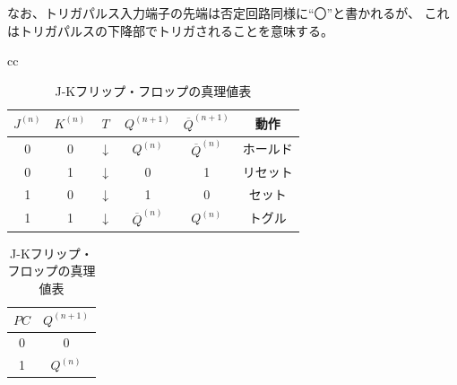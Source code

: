 \documentclass[12pt]{jarticle}
\begin{document}
\begin{itemize}
          なお、トリガパルス入力端子の先端は否定回路同様に``〇''と書かれるが、
          これはトリガパルスの下降部でトリガされることを意味する。
          \begin{table}[h]
              \caption{J-Kフリップ・フロップの真理値表}
              \begin{center}
                  \begin{tabular}{cc}
                      \begin{minipage}{0.6\hsize}
                          \begin{center}
                              \begin{tabular}{|c|c|c|c|c|c|}
                                  \hline
                                  $J^{(n)}$ & $K^{(n)}$ & $T$          & $Q^{(n+1)}$            & ${\overline{Q}}^{(n + 1)}$ & 動作     \\
                                  \hline
                                  0         & 0         & $\downarrow$ & $Q^{(n)}$              & $ {\overline{Q}}^{(n)}$    & ホールド \\
                                  \hline
                                  0         & 1         & $\downarrow$ & 0                      & 1                          & リセット \\
                                  \hline
                                  1         & 0         & $\downarrow$ & 1                      & 0                          & セット   \\
                                  \hline
                                  1         & 1         & $\downarrow$ & ${\overline{Q}}^{(n)}$ & $Q^{(n)}$                  & トグル   \\
                                  \hline
                              \end{tabular}
                          \end{center}
                      \end{minipage}
                      \begin{minipage}{0.4\hsize}
                          \begin{center}
                              \begin{tabular}{|c|c|}
                                  \hline
                                  $PC$ & $Q^{(n + 1)}$ \\
                                  \hline
                                  0    & 0             \\
                                  \hline
                                  1    & $Q^{(n)}$     \\
                                  \hline
                              \end{tabular}
                          \end{center}
                      \end{minipage}
                  \end{tabular}
              \end{center}
              \label{table13}
          \end{table}


\end{itemize}
\end{document}
